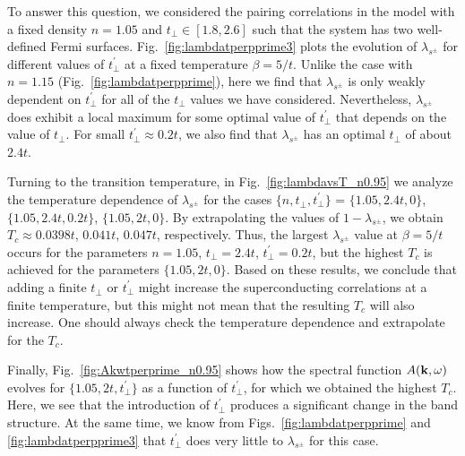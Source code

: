 \documentclass[prb,twocolumn,amsmath,amssymb,superscriptaddress,floatfix,nofootinbib]{revtex4-2}
\begin{document}
To answer this question, we considered the pairing correlations in the model with a fixed density $n=1.05$ and $t_\perp \in [1.8,2.6]$ such that the system has two well-defined Fermi surfaces. Fig.~\ref{fig:lambdatperpprime3} plots the  evolution of $\lambda_{s^\pm}$ for different values of $t_{\perp}^{\prime}$ at a fixed temperature $\beta= 5/t$. Unlike the case with $n=1.15$ (Fig.~\ref{fig:lambdatperpprime}), here we find that $\lambda_{s^\pm}$ is only weakly dependent on $t_{\perp}^{\prime}$ for all of the $t_{\perp}$ values we have considered. 
Nevertheless, $\lambda_{s^\pm}$ does exhibit a local maximum for some optimal value of $t_\perp^\prime$ that depends on the value of $t_\perp$. For small $t_\perp^\prime \approx 0.2t$, we also find that $\lambda_{s^\pm}$ has an optimal $t_{\perp}$ of about $2.4t$. 

Turning to the transition temperature, in Fig.~\ref{fig:lambdavsT_n0.95} we analyze the temperature dependence of $\lambda_{s^\pm}$ for the cases $\{n, t^{\phantom\prime}_\perp, t^\prime_\perp\}$  = $\{1.05,2.4t,0\}$, $\{1.05,2.4t,0.2t\}$, $\{1.05,2t,0\}$. 
By extrapolating the values of $1-\lambda_{s^\pm}$, we obtain $T_c \approx 0.0398t$,  $0.041t$, $0.047t$, respectively. Thus, the largest $\lambda_{s^\pm}$ value at $\beta = 5/t$ occurs for the parameters $n=1.05$, $t_\perp = 2.4t$, $t_\perp^\prime=0.2t$, but the highest $T_c$ is achieved for the parameters $\{1.05,2t,0\}$. Based on these results, we conclude that adding a finite $t^{\phantom\prime}_{\perp}$ or $t_{\perp}^{\prime}$ might increase the superconducting correlations at a finite temperature, but this might not mean that the resulting $T_c$ will also increase. One should always check the temperature dependence and extrapolate for the $T_c$.

Finally, Fig.~\ref{fig:Akwtperprime_n0.95} shows how the spectral function $A({\bf k},\omega)$ evolves for $\{1.05,2t,t^\prime_\perp\}$ as a function of $t_\perp^\prime$, for which we obtained the highest $T_c$. Here, we see that the introduction of $t_\perp^\prime$ produces a significant change in the band structure. At the same time, we know from Figs.~\ref{fig:lambdatperpprime} and \ref{fig:lambdatperpprime3} that $t_{\perp}^{\prime}$ does very little to $\lambda_{s^\pm}$ for this case. 
 
\end{document}
